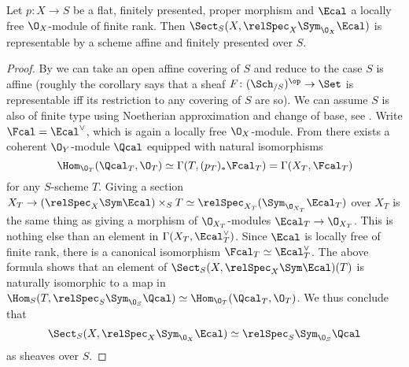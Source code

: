             \begin{lemma}
                \label{lemma:wang_3_1_3}
                Let $p\colon X \to S$ be a flat, finitely presented, proper morphism and $\Ecal$ a locally free $\O_X$-module of finite rank. Then $\Sect_S(X, \relSpec_X \Sym_{\O_X}\Ecal)$ is representable by a scheme affine and finitely presented over $S$.
            \end{lemma}
            \begin{proof}
                By \cite[Corollaire~4.5.5]{EGA1-second} we can take an open affine covering of $S$ and reduce to the case $S$ is affine (roughly the corollary says that a sheaf $F\colon (\Sch_{/S})^{\op} \to \Set$ is representable iff its restriction to any covering of $S$ are so). We can assume $S$ is also of finite type using Noetherian approximation and change of base, see \cite[Tome~3, 8]{EGA4}.
                Write $\Fcal = \Ecal^{\vee}$, which is again a locally free $\O_X$-module. From \cite[Tome~2, Thm~7.7.6, Remarque~7.7.9]{EGA3} there exists a coherent $\O_Y$-module $\Qcal$ equipped with natural isomorphisms \[\Hom_{\O_T}(\Qcal_T, \O_T) \simeq \Gamma(T, (p_T)_*\Fcal_T) = \Gamma(X_T, \Fcal_T) \] for any $S$-scheme $T$. Giving a section $X_T \to (\relSpec_X \Sym \Ecal) \times_S T \simeq \relSpec_{X_T}(\Sym_{\O_{X_T}} \Ecal_T)$ over $X_T$ is the same thing as giving a morphism of $\O_{X_T}$-modules $\Ecal_T \to \O_{X_T}$. This is nothing else than an element in $\Gamma(X_T, \Ecal_T^{\vee})$. Since $\Ecal$ is locally free of finite rank, there is a canonical isomorphism $\Fcal_T \simeq \Ecal_T^{\vee}$. The above formula shows that an element of $\Sect_S(X, \relSpec_X \Sym \Ecal)(T)$ is naturally isomorphic to a map in $\Hom_S(T, \relSpec_S \Sym_{\O_S} \Qcal) \simeq \Hom_{\O_T}(\Qcal_T, \O_T)$. We thus conclude that \[\Sect_S(X, \relSpec_X \Sym_{\O_X} \Ecal) \simeq \relSpec_S \Sym_{\O_S} \Qcal \] as sheaves over $S$.
            \end{proof}

